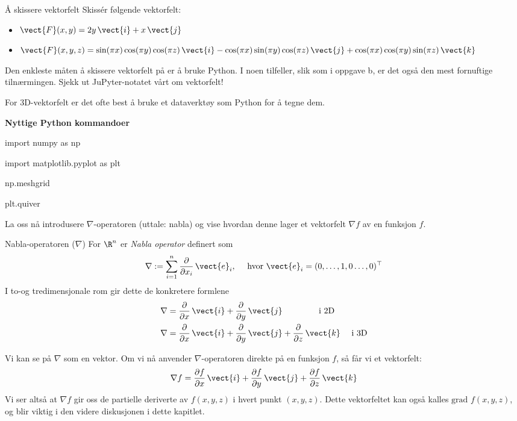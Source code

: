 \begin{eks}{Å skissere vektorfelt}
Skissér følgende vektorfelt:
\begin{itemize}
  \item[a)] $\vect{F}(x, y) = 2y\,\vect{i} + x\,\vect{j}$
  \item[b)] $\vect{F}(x, y, z) = \sin(\pi x)\cos(\pi y) \cos(\pi z)\,\vect{i} - \cos(\pi x)\sin(\pi y)\cos(\pi z)\,\vect{j} + \cos(\pi x) \cos(\pi y) \sin(\pi z)\,\vect{k}$
\end{itemize}
Den enkleste måten å skissere vektorfelt på er å bruke Python. I noen tilfeller, slik som i oppgave b, er det også den mest fornuftige tilnærmingen. Sjekk ut JuPyter-notatet vårt om vektorfelt! 
\end{eks}
For 3D-vektorfelt er det ofte best å bruke et dataverktøy som Python for å tegne dem. 
\begin{minipage}{\columnwidth}
\begin{oppsum}{\textbf{Nyttige Python kommandoer}}
\begin{minipage}{.9\columnwidth}
\begin{lst}{}
import numpy as np

import matplotlib.pyplot as plt

np.meshgrid

plt.quiver
\end{lst}
\end{minipage}
\end{oppsum}
\end{minipage}
La oss nå introdusere $\nabla$-operatoren (uttale: nabla) og vise hvordan denne lager et vektorfelt $\nabla f$ av en funksjon $f$.

\begin{defn}{Nabla-operatoren ($\nabla$)} For $\R^n$ er \emph{Nabla operator} definert som
\[\nabla := \sum_{i=1}^n \frac{\partial}{\partial x_i}\, \vect{e}_i , \quad \text{ hvor } \vect{e}_i = (0,\ldots, 1, 0\ldots, 0)^\top\]
I to-og tredimensjonale rom gir dette de konkretere formlene
\begin{align*}
\nabla &= \frac{\partial}{\partial x}\, \vect{i} + \frac{\partial}{\partial y}\, \vect{j} \qquad \qquad  \text{ i 2D}\\
\nabla &= \frac{\partial}{\partial x}\, \vect{i} + \frac{\partial}{\partial y}\, \vect{j} + \frac{\partial}{\partial z}\, \vect{k} \quad \text{ i 3D}
\end{align*}
\label{defn:nabla}
\end{defn}
Vi kan se på $\nabla$ som en vektor.  Om vi nå anvender $\nabla$-operatoren direkte på en funksjon $f$, så får vi et vektorfelt:
\[
\nabla f = \frac{\partial f}{\partial x}\, \vect{i} + \frac{\partial f}{\partial y}\, \vect{j} + \frac{\partial f}{\partial z}\, \vect{k}
\]
Vi ser altså at $\nabla f$ gir oss de partielle deriverte av \(f(x,y,z)\) i hvert punkt $(x,y,z)$. Dette vektorfeltet kan også kalles \(\text{grad } f (x,y,z)\), og blir viktig i den videre diskusjonen i dette kapitlet.

